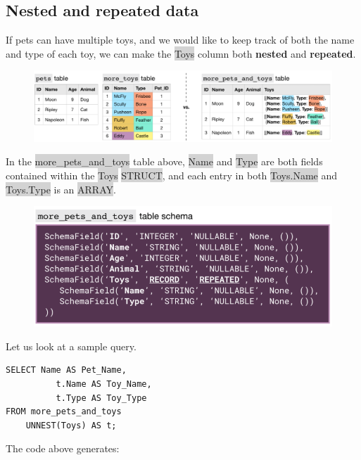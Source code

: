 \documentclass[11pt]{article}
\begin{document}
{{{{{{{{\subsection{Nested and repeated data}
If pets can have multiple toys, and we would like to keep track of both the name and type of each toy, we can make the \colorbox{lightgray}{Toys} column both \textbf{nested} and \textbf{repeated}.
\begin{figure}[H]
\includegraphics[scale = 0.75]{6_7}
\centering
\end{figure}
\vspace{-4mm}
In the \colorbox{lightgray}{more\_pets\_and\_toys} table above, \colorbox{lightgray}{Name} and \colorbox{lightgray}{Type} are both fields contained within the \colorbox{lightgray}{Toys} \colorbox{lightgray}{STRUCT}, and each entry in both \colorbox{lightgray}{Toys.Name} and \colorbox{lightgray}{Toys.Type} is an \colorbox{lightgray}{ARRAY}.
\begin{figure}[H]
\includegraphics[scale = 0.9]{6_8}
\centering
\end{figure}
\vspace{-4mm}
Let us look at a sample query. 
\begin{lstlisting}
SELECT Name AS Pet_Name, 
	      t.Name AS Toy_Name, 
	      t.Type AS Toy_Type
FROM more_pets_and_toys 
	UNNEST(Toys) AS t; 
\end{lstlisting}
The code above generates:

}}}}}}}}
\end{document}
